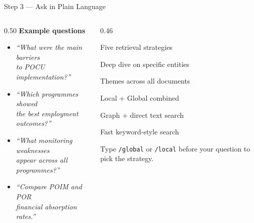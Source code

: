 \documentclass[aspectratio=169,11pt]{beamer}
\begin{document}
\begin{frame}{Step 3 — Ask in Plain Language}
  \vspace{0.2cm}
  \begin{columns}[t]
    \begin{column}{0.50\textwidth}
      \textbf{Example questions}\\[8pt]
      \begin{itemize}\setlength\itemsep{10pt}
        \item \textit{``What were the main barriers\\
              to POCU implementation?''}
        \item \textit{``Which programmes showed\\
              the best employment outcomes?''}
        \item \textit{``What monitoring weaknesses\\
              appear across all programmes?''}
        \item \textit{``Compare POIM and POR\\
              financial absorption rates.''}
      \end{itemize}
    \end{column}
    \begin{column}{0.46\textwidth}
      \begin{block}{Five retrieval strategies}
        \begin{description}\setlength\itemsep{5pt}
          \item[\textbf{Local}] Deep dive on specific entities
          \item[\textbf{Global}] Themes across all documents
          \item[\textbf{Hybrid}] Local + Global combined
          \item[\textbf{Mix}] Graph + direct text search
          \item[\textbf{Naive}] Fast keyword-style search
        \end{description}
      \end{block}
      \vspace{0.3em}
      {\scriptsize Type \texttt{/global} or \texttt{/local} before your question
       to pick the strategy.}
    \end{column}
  \end{columns}
\end{frame}

\end{document}
